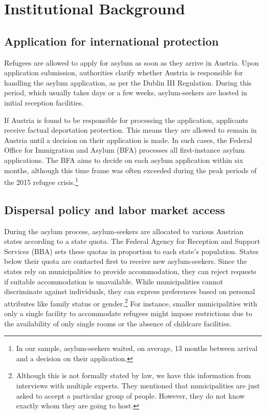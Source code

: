 
\section{Institutional Background} \label{sec:background}
\subsection*{Application for international protection}

Refugees are allowed to apply for asylum as soon as they arrive in Austria. Upon application submission, authorities clarify whether Austria is responsible for handling the asylum application, as per the Dublin III Regulation. During this period, which usually takes days or a few weeks, asylum-seekers are hosted in initial reception facilities.

If Austria is found to be responsible for processing the application, applicants receive factual deportation protection. This means they are allowed to remain in Austria until a decision on their application is made. In such cases, the Federal Office for Immigration and Asylum (BFA) processes all first-instance asylum applications. The BFA aims to decide on each asylum application within six months, although this time frame was often exceeded during the peak periods of the 2015 refugee crisis.\footnote{In our sample, asylum-seekers waited, on average, 13 months between arrival and a decision on their application.}

\subsection*{Dispersal policy and labor market access}\label{sec:allocation}

During the asylum process, asylum-seekers are allocated to various Austrian states according to a state quota. The Federal Agency for Reception and Support Services (BBA) sets these quotas in proportion to each state's population. States below their quota are contacted first to receive new asylum-seekers. Since the states rely on municipalities to provide accommodation, they can reject requests if suitable accommodation is unavailable. While municipalities cannot discriminate against individuals, they can express preferences based on personal attributes like family status or gender.\footnote{Although this is not formally stated by law, we have this information from interviews with multiple experts. They mentioned that municipalities are just asked to accept a particular group of people. However, they do not know exactly whom they are going to host.} For instance, smaller municipalities with only a single facility to accommodate refugees might impose restrictions due to the availability of only single rooms or the absence of childcare facilities.

